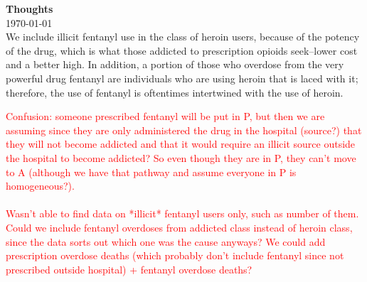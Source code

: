 \documentclass[12pt]{article}
\begin{document}
\textbf{Thoughts} \\
\today \\

We include illicit fentanyl use in the class of heroin users, because of the potency of the drug, which is what those addicted to prescription opioids seek--lower cost and a better high. In addition, a portion of those who overdose from the very powerful drug fentanyl are individuals who are using heroin that is laced with it; therefore, the use of fentanyl is oftentimes intertwined with the use of heroin. 


\textcolor{red}{Confusion: someone prescribed fentanyl will be put in P, but then we are assuming since they are only administered the drug in the hospital (source?) that they will not become addicted and that it would require an illicit source outside the hospital to become addicted? %
So even though they are in P, they can't move to A (although we have that pathway and assume everyone in P is homogeneous?). \\ \\
Wasn't able to find data on *illicit* fentanyl users only, such as number of them. Could we include fentanyl overdoses from addicted class instead of heroin class, since the data sorts out which one was the cause anyways? We could add prescription overdose deaths (which probably don't include fentanyl since not prescribed outside hospital) + fentanyl overdose deaths?}
\end{document}
